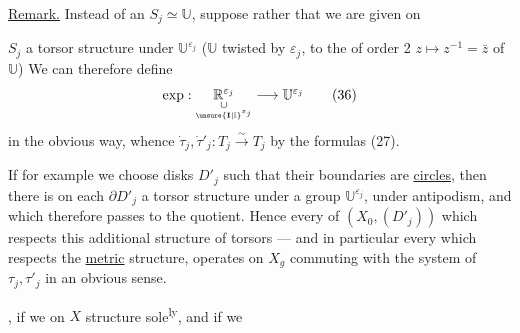 \uline{Remark.} Instead of an  $S_j\simeq\mathbb U$,
suppose rather that we are given on


$S_j$ a torsor structure under $\mathbb U^{\varepsilon_j}$
($\mathbb U$ twisted by $\varepsilon_j$,  to the  of order 2
$z\longmapsto z^{-1}=\bar z$ of $\mathbb U$) We can therefore define
\[
\exp:\underset{\underset{\unsure{\mathbf I|\mathbb I}^{\varepsilon_j}}{\cup}}{\mathbb R^{\varepsilon_j}}
\longrightarrow\mathbb U^{\varepsilon_j}
\tag{36}
\]
in the obvious way, whence 
$\dot\tau_j,\dot\tau'_j:T_j\xrightarrow{\sim}T_j$ by the formulas (27).

If for example we choose disks $D'_j$ such that their boundaries are 
\uline{circles}, then there is on each  $\partial D'_j$
a torsor structure under a group $\mathbb U^{\varepsilon_j}$,
 under antipodism, and which therefore passes to the quotient.
Hence every  of $(X_0,(D'_j))$ which respects this
additional structure of torsors --- and in particular every  which respects
the \uline{metric} structure,  operates on $X_g$ commuting
with the system of $\tau_j,\tau'_j$ in an obvious sense.

, if we   on $X$
 \uline{} structure sole\textsuperscript{ly}, and if we